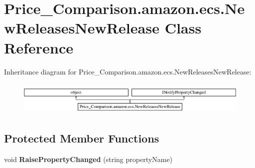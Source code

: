 \hypertarget{class_price___comparison_1_1amazon_1_1ecs_1_1_new_releases_new_release}{\section{Price\-\_\-\-Comparison.\-amazon.\-ecs.\-New\-Releases\-New\-Release Class Reference}
\label{class_price___comparison_1_1amazon_1_1ecs_1_1_new_releases_new_release}
}


 


Inheritance diagram for Price\-\_\-\-Comparison.\-amazon.\-ecs.\-New\-Releases\-New\-Release\-:\begin{figure}[H]
\begin{center}
\leavevmode
\includegraphics[height=1.623188cm]{class_price___comparison_1_1amazon_1_1ecs_1_1_new_releases_new_release}
\end{center}
\end{figure}
\subsection*{Protected Member Functions}
\begin{DoxyCompactItemize}
\item 
\hypertarget{class_price___comparison_1_1amazon_1_1ecs_1_1_new_releases_new_release_adb2667b6ebb0ffee11fc39978aa3c17d}{void {\bfseries Raise\-Property\-Changed} (string property\-Name)}\label{class_price___comparison_1_1amazon_1_1ecs_1_1_new_releases_new_release_adb2667b6ebb0ffee11fc39978aa3c17d}

\end{DoxyCompactItemize}
